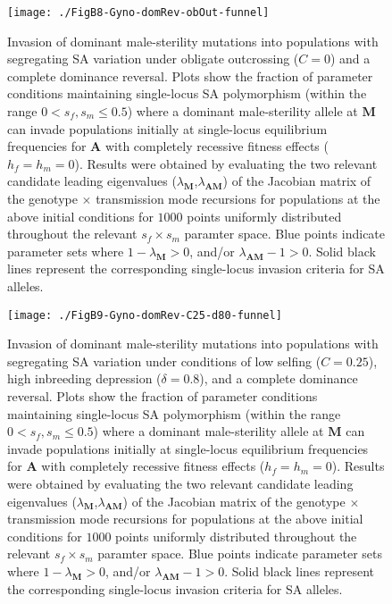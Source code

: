 \documentclass{article}
\begin{document}
\begin{figure}[ht!]
\centering
\texttt{[image: ./FigB8-Gyno-domRev-obOut-funnel]}
\caption{Invasion of dominant male-sterility mutations into populations with segregating SA variation under obligate outcrossing ($C=0$) and a complete dominance reversal. Plots show the fraction of parameter conditions maintaining single-locus SA polymorphism (within the range $0 < s_f,s_m \leq 0.5$) where a dominant male-sterility allele at $\mathbf{M}$ can invade populations initially at single-locus equilibrium frequencies for $\mathbf{A}$ with completely recessive fitness effects ($h_f=h_m=0$). Results were obtained by evaluating the two relevant candidate leading eigenvalues ($\lambda_{\mathbf{M}}$,$\lambda_{\mathbf{AM}}$) of the Jacobian matrix of the genotype $\times$ transmission mode recursions for populations at the above initial conditions for $1000$ points uniformly distributed throughout the relevant $s_f \times s_m$ paramter space. Blue points indicate parameter sets where $1 - \lambda_{\mathbf{M}} > 0$, and/or $\lambda_{\mathbf{AM}} - 1 > 0$. Solid black lines represent the corresponding single-locus invasion criteria for SA alleles.}
\label{fig:GynObOutFunnelDomRev}
\end{figure}
\newpage{}

\begin{figure}[ht!]
\centering
\texttt{[image: ./FigB9-Gyno-domRev-C25-d80-funnel]}
\caption{Invasion of dominant male-sterility mutations into populations with segregating SA variation under conditions of low selfing ($C = 0.25$), high inbreeding depression ($\delta = 0.8$), and a complete dominance reversal. Plots show the fraction of parameter conditions maintaining single-locus SA polymorphism (within the range $0 < s_f,s_m \leq 0.5$) where a dominant male-sterility allele at $\mathbf{M}$ can invade populations initially at single-locus equilibrium frequencies for $\mathbf{A}$ with completely recessive fitness effects ($h_f=h_m=0$). Results were obtained by evaluating the two relevant candidate leading eigenvalues ($\lambda_{\mathbf{M}}$,$\lambda_{\mathbf{AM}}$) of the Jacobian matrix of the genotype $\times$ transmission mode recursions for populations at the above initial conditions for $1000$ points uniformly distributed throughout the relevant $s_f \times s_m$ paramter space. Blue points indicate parameter sets where $1 - \lambda_{\mathbf{M}} > 0$, and/or $\lambda_{\mathbf{AM}} - 1 > 0$. Solid black lines represent the corresponding single-locus invasion criteria for SA alleles.}
\label{fig:GynC25d80FunnelDomRev}
\end{figure}
\newpage{}
\end{document}
